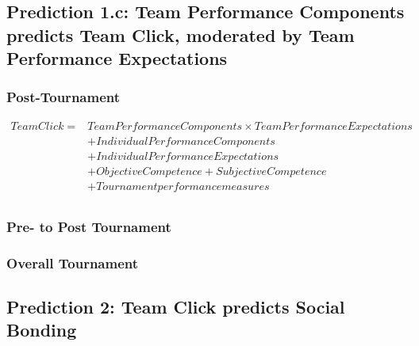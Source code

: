 {  \subsection{Prediction 1.c: Team Performance Components predicts Team Click, moderated by Team Performance Expectations}

  \subsubsection{Post-Tournament}

       \begin{align*}
         Team Click =  & Team Performance Components \times Team Performance Expectations \\
                   &+ Individual Performance Components \\
                   &+ Individual Performance Expectations \\
                   &+ Objective Competence + Subjective Competence  \\
                   &+ Tournament performance measures \\
       \end{align*}


  



  \subsubsection{Pre- to Post Tournament}

  \subsubsection{Overall Tournament}














  \subsection{Prediction 2: Team Click predicts Social Bonding \label{app8:MLM2}}



}
